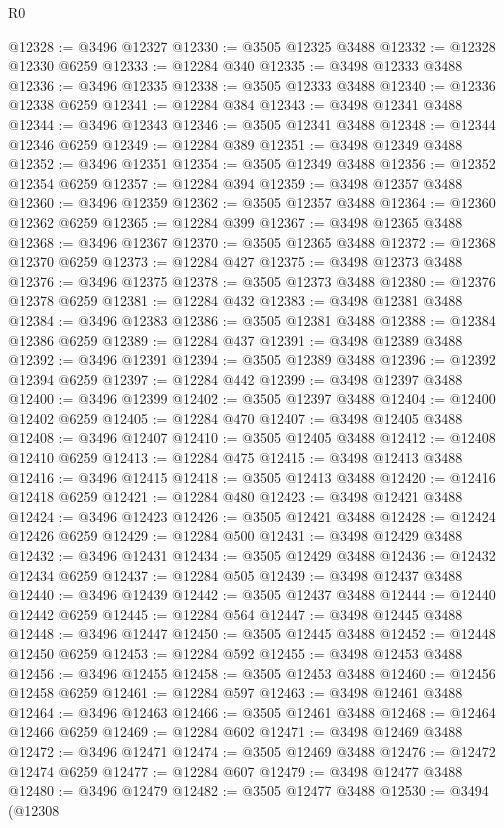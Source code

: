 \begin{lexlean}{R0}
\begin{coremodule}
@12328 := @3496 @12327
@12330 := @3505 @12325 @3488
@12332 := @12328 @12330 @6259
@12333 := @12284 @340
@12335 := @3498 @12333 @3488
@12336 := @3496 @12335
@12338 := @3505 @12333 @3488
@12340 := @12336 @12338 @6259
@12341 := @12284 @384
@12343 := @3498 @12341 @3488
@12344 := @3496 @12343
@12346 := @3505 @12341 @3488
@12348 := @12344 @12346 @6259
@12349 := @12284 @389
@12351 := @3498 @12349 @3488
@12352 := @3496 @12351
@12354 := @3505 @12349 @3488
@12356 := @12352 @12354 @6259
@12357 := @12284 @394
@12359 := @3498 @12357 @3488
@12360 := @3496 @12359
@12362 := @3505 @12357 @3488
@12364 := @12360 @12362 @6259
@12365 := @12284 @399
@12367 := @3498 @12365 @3488
@12368 := @3496 @12367
@12370 := @3505 @12365 @3488
@12372 := @12368 @12370 @6259
@12373 := @12284 @427
@12375 := @3498 @12373 @3488
@12376 := @3496 @12375
@12378 := @3505 @12373 @3488
@12380 := @12376 @12378 @6259
@12381 := @12284 @432
@12383 := @3498 @12381 @3488
@12384 := @3496 @12383
@12386 := @3505 @12381 @3488
@12388 := @12384 @12386 @6259
@12389 := @12284 @437
@12391 := @3498 @12389 @3488
@12392 := @3496 @12391
@12394 := @3505 @12389 @3488
@12396 := @12392 @12394 @6259
@12397 := @12284 @442
@12399 := @3498 @12397 @3488
@12400 := @3496 @12399
@12402 := @3505 @12397 @3488
@12404 := @12400 @12402 @6259
@12405 := @12284 @470
@12407 := @3498 @12405 @3488
@12408 := @3496 @12407
@12410 := @3505 @12405 @3488
@12412 := @12408 @12410 @6259
@12413 := @12284 @475
@12415 := @3498 @12413 @3488
@12416 := @3496 @12415
@12418 := @3505 @12413 @3488
@12420 := @12416 @12418 @6259
@12421 := @12284 @480
@12423 := @3498 @12421 @3488
@12424 := @3496 @12423
@12426 := @3505 @12421 @3488
@12428 := @12424 @12426 @6259
@12429 := @12284 @500
@12431 := @3498 @12429 @3488
@12432 := @3496 @12431
@12434 := @3505 @12429 @3488
@12436 := @12432 @12434 @6259
@12437 := @12284 @505
@12439 := @3498 @12437 @3488
@12440 := @3496 @12439
@12442 := @3505 @12437 @3488
@12444 := @12440 @12442 @6259
@12445 := @12284 @564
@12447 := @3498 @12445 @3488
@12448 := @3496 @12447
@12450 := @3505 @12445 @3488
@12452 := @12448 @12450 @6259
@12453 := @12284 @592
@12455 := @3498 @12453 @3488
@12456 := @3496 @12455
@12458 := @3505 @12453 @3488
@12460 := @12456 @12458 @6259
@12461 := @12284 @597
@12463 := @3498 @12461 @3488
@12464 := @3496 @12463
@12466 := @3505 @12461 @3488
@12468 := @12464 @12466 @6259
@12469 := @12284 @602
@12471 := @3498 @12469 @3488
@12472 := @3496 @12471
@12474 := @3505 @12469 @3488
@12476 := @12472 @12474 @6259
@12477 := @12284 @607
@12479 := @3498 @12477 @3488
@12480 := @3496 @12479
@12482 := @3505 @12477 @3488
@12530 := @3494
    (@12308

\end{coremodule}
\end{lexlean}
